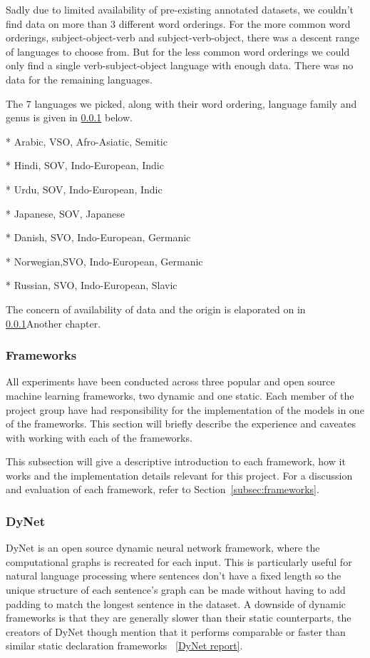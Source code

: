 Sadly due to limited availability of pre-existing annotated datasets, we
couldn't find data on more than 3 different word orderings. For the more common
word orderings, subject-object-verb and subject-verb-object, there was a descent
range of languages to choose from. But for the less common word orderings we
could only find a single verb-subject-object language with enough data. There
was no data for the remaining languages. 

The 7 languages we picked, along with their word ordering, language family and
genus is given in \ref{} below.

* Arabic,   VSO, Afro-Asiatic, Semitic 

* Hindi,    SOV, Indo-European, Indic

* Urdu,     SOV, Indo-European, Indic

* Japanese, SOV, Japanese

* Danish,   SVO, Indo-European, Germanic

* Norwegian,SVO, Indo-European, Germanic

* Russian,  SVO, Indo-European, Slavic

The concern of availability of data and the origin is elaporated on in
\ref{}{Another chapter}.


\subsubsection{Frameworks}

All experiments have been conducted across three popular and open source machine
learning frameworks, two dynamic and one static. Each member of the project
group have had responsibility for the implementation of the models in one of the
frameworks. This section will briefly describe the experience and caveates with
working with each of the frameworks.

This subsection will give a descriptive introduction to each framework, how it
works and the implementation details relevant for this project. For a discussion
and evaluation of each framework, refer to Section~\ref{subsec:frameworks}.


\subsubsection*{DyNet}

DyNet is an open source dynamic neural network framework, where the
computational graphs is recreated for each input. This is particularly useful
for natural language processing where sentences don't have a fixed length so the
unique structure of each sentence's graph can be made without having to add
padding to match the longest sentence in the dataset. A downside of dynamic
frameworks is that they are generally slower than their static counterparts,
the creators of DyNet though mention that it performs comparable or faster than
similar static declaration frameworks ~\ref{DyNet report}.   

